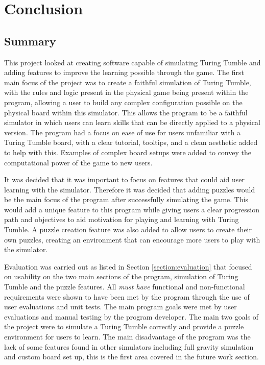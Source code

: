 \documentclass{l4proj}
\begin{document}



\chapter{Conclusion}
\section{Summary}
This project looked at creating software capable of simulating Turing Tumble and adding features to improve the learning possible through the game. The first main focus of the project was to create a faithful simulation of Turing Tumble, with the rules and logic present in the physical game being present within the program, allowing a user to build any complex configuration possible on the physical board within this simulator. This allows the program to be a faithful simulator in which users can learn skills that can be directly applied to a physical version. The program had a focus on ease of use for users unfamiliar with a Turing Tumble board, with a clear tutorial, tooltips, and a clean aesthetic added to help with this. Examples of complex board setups were added to convey the computational power of the game to new users. 

It was decided that it was important to focus on features that could aid user learning with the simulator. Therefore it was decided that adding puzzles would be the main focus of the program after successfully simulating the game. This would add a unique feature to this program while giving users a clear progression path and objectives to aid motivation for playing and learning with Turing Tumble. A puzzle creation feature was also added to allow users to create their own puzzles, creating an environment that can encourage more users to play with the simulator. 

Evaluation was carried out as listed in Section \ref{section:evaluation} that focused on usability on the two main sections of the program, simulation of  Turing Tumble and the puzzle features. All \emph{must have} functional and non-functional requirements were shown to have been met by the program through the use of user evaluations and unit tests. The main program goals were met by user evaluations and manual testing by the program developer. The main two goals of the project were to simulate a Turing Tumble correctly and provide a puzzle environment for users to learn. The main disadvantage of the program was the lack of some features found in other simulators including full gravity simulation and custom board set up, this is the first area covered in the future work section.
\end{document}

